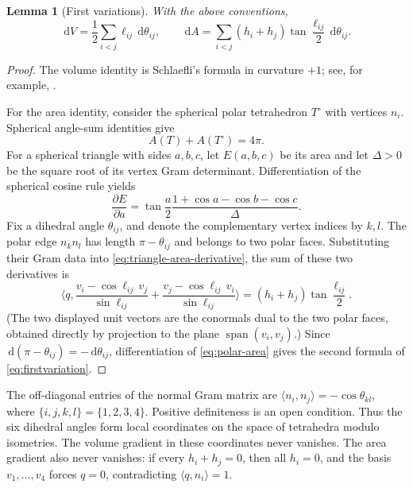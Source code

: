 \documentclass[11pt,reqno]{amsart}
\newtheorem{lemma}[theorem]{Lemma}
\theoremstyle{remark}
\newcommand{\dd}{\,\mathrm d}
\newcommand{\ip}[2]{\langle #1,#2\rangle}
\begin{document}
\begin{lemma}[First variations]\label{lem:firstvariation}
With the above conventions,
\begin{equation}\label{eq:firstvariation}
 \dd V=\frac12\sum_{i<j}\ell_{ij}\dd\theta_{ij},
 \qquad
 \dd A=\sum_{i<j}(h_i+h_j)\tan\frac{\ell_{ij}}2\dd\theta_{ij}.
\end{equation}
\end{lemma}
\begin{proof}
The volume identity is Schlaefli's formula in curvature $+1$; see, for example, \cite[\S3.2]{Vinberg}.

For the area identity, consider the spherical polar tetrahedron $T^\circ$ with vertices $n_i$. Spherical angle-sum identities give
\begin{equation}\label{eq:polar-area}
 A(T)+A(T^\circ)=4\pi.
\end{equation}
For a spherical triangle with sides $a,b,c$, let $E(a,b,c)$ be its area and let $\Delta>0$ be the square root of its vertex Gram determinant. Differentiation of the spherical cosine rule yields
\begin{equation}\label{eq:triangle-area-derivative}
 \frac{\partial E}{\partial a}
 =\tan\frac a2\frac{1+\cos a-\cos b-\cos c}{\Delta}.
\end{equation}
Fix a dihedral angle $\theta_{ij}$, and denote the complementary vertex indices by $k,l$. The polar edge $n_kn_l$ has length $\pi-\theta_{ij}$ and belongs to two polar faces. Substituting their Gram data into \eqref{eq:triangle-area-derivative}, the sum of these two derivatives is
\[
 \ip{q}{\frac{v_i-\cos\ell_{ij}\,v_j}{\sin\ell_{ij}}
            +\frac{v_j-\cos\ell_{ij}\,v_i}{\sin\ell_{ij}}}
 =(h_i+h_j)\tan\frac{\ell_{ij}}2.
\]
(The two displayed unit vectors are the conormals dual to the two polar faces, obtained directly by projection to the plane $\operatorname{span}(v_i,v_j)$.) Since $\dd(\pi-\theta_{ij})=-\dd\theta_{ij}$, differentiation of \eqref{eq:polar-area} gives the second formula of \eqref{eq:firstvariation}.
\end{proof}

The off-diagonal entries of the normal Gram matrix are $\ip{n_i}{n_j}=-\cos\theta_{kl}$, where $\{i,j,k,l\}=\{1,2,3,4\}$. Positive definiteness is an open condition. Thus the six dihedral angles form local coordinates on the space of tetrahedra modulo isometries. The volume gradient in these coordinates never vanishes. The area gradient also never vanishes: if every $h_i+h_j=0$, then all $h_i=0$, and the basis $v_1,\ldots,v_4$ forces $q=0$, contradicting $\ip{q}{n_i}=1$.
\end{document}
